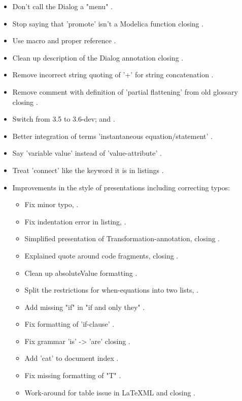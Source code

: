 \begin{itemize}
\item Don't call the Dialog a "menu" .
\item Stop saying that 'promote' isn't a Modelica function  closing .
\item Use macro and proper reference .
\item Clean up description of the Dialog annotation  closing .
\item Remove incorrect string quoting of '+' for string concatenation .
\item Remove comment with definition of 'partial flattening' from old glossary  closing .
\item Switch from 3.5 to 3.6-dev;  and .
\item Better integration of terms 'instantaneous equation/statement' .
\item Say 'variable value' instead of 'value-attribute' .
\item Treat 'connect' like the keyword it is in listings .
\item Improvements in the style of presentations including correcting typos:
\begin{itemize}
\item Fix minor typo, .
\item Fix indentation error in listing, .
\item Simplified presentation of Transformation-annotation,  closing .
\item Explained quote around code fragments,  closing .
\item Clean up absoluteValue formatting .
\item Split the restrictions for when-equations into two lists, .
\item Add missing "if" in "if and only they" .
\item Fix formatting of 'if-clause' .
\item Fix grammar 'is' -> 'are'  closing .
\item Add 'cat' to document index  .
\item Fix missing formatting of "T" .
\item Work-around for table issue in LaTeXML  and  closing .

\end{itemize}
\end{itemize}

